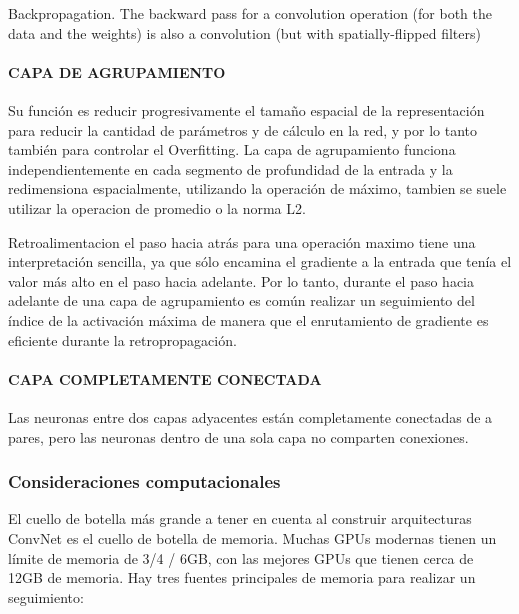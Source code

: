 \documentclass[a4paper,10pt]{article}
\begin{document}
Backpropagation. The backward pass for a convolution operation (for both the data and the weights) is also a convolution (but with spatially-flipped filters)

\paragraph{CAPA DE AGRUPAMIENTO} 
Su función es reducir progresivamente el tamaño espacial de la representación para reducir la cantidad de parámetros y de cálculo en la red, y por lo tanto también para controlar
el Overfitting. La capa de agrupamiento funciona independientemente en cada segmento de profundidad de la entrada y la redimensiona espacialmente, utilizando la operación de máximo, 
tambien se suele utilizar la operacion de promedio o la norma L2.

Retroalimentacion
el paso hacia atrás para una operación maximo tiene una interpretación sencilla, ya que sólo encamina el gradiente a la entrada que tenía el valor más alto en el paso hacia
adelante. Por lo tanto, durante el paso hacia adelante de una capa de agrupamiento es común realizar un seguimiento del índice de la activación máxima de manera que 
el enrutamiento de gradiente es eficiente durante la retropropagación.

\paragraph{CAPA COMPLETAMENTE CONECTADA} 
Las neuronas entre dos capas adyacentes están completamente conectadas de a pares, pero las neuronas dentro de una sola capa no comparten conexiones.

\subsubsection {Consideraciones computacionales}
El cuello de botella más grande a tener en cuenta al construir arquitecturas ConvNet es el cuello de botella de memoria. 
Muchas GPUs modernas tienen un límite de memoria de 3/4 / 6GB, con las mejores GPUs que tienen cerca de 12GB de memoria. 
Hay tres fuentes principales de memoria para realizar un seguimiento:
\end{document}
